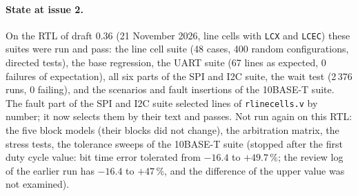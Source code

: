 \documentclass[10pt,a4paper]{article}
\begin{document}
\paragraph{State at issue 2.}

On the RTL of draft 0.36 (21 November 2026, line cells with \texttt{LCX} and \texttt{LCEC}) these suites were run
and pass: the line cell suite (48 cases, 400 random configurations, directed tests), the base regression, the
UART suite (67 lines as expected, 0 failures of expectation), all six parts of the SPI and I2C suite, the wait
test (2\,376 runs, 0 failing), and the scenarios and fault insertions of the 10BASE-T suite. The fault part of
the SPI and I2C suite selected lines of \texttt{rlinecells.v} by number; it now selects them by their text and
passes. Not run again on this RTL: the five block models (their blocks did not change), the arbitration
matrix, the stress tests, the tolerance sweeps of the 10BASE-T suite (stopped after the first duty cycle
value: bit time error tolerated from $-16.4$ to $+49.7\,\%$; the review log of the earlier run has $-16.4$ to $+47\,\%$, and the difference of the upper value was not examined).
\end{document}
